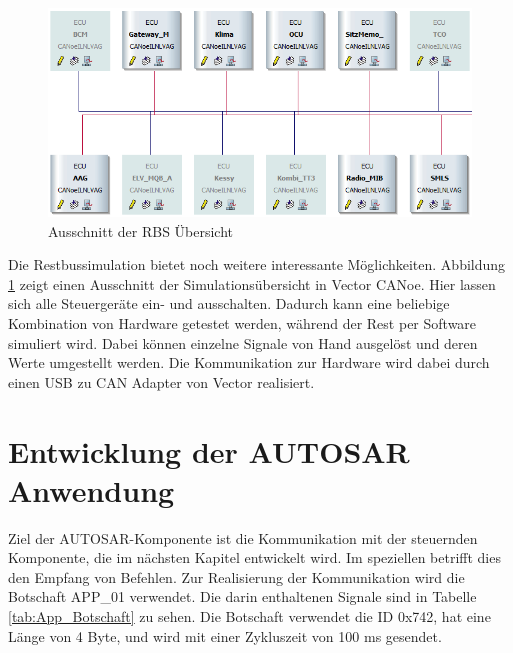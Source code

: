 \documentclass[
  a4paper,					    %
  twoside,
  DIV=calc,     				%
  bibliography=totoc,
  cleardoublepage=empty,
  ngerman,     					%
  final       					%
]{scrbook}
\begin{document}
\begin{figure}[tb]
    \centering
    \includegraphics[width=\textwidth]{rbs_ausschnitt}
    \caption{Ausschnitt der RBS Übersicht}
    \label{fig:rbs}
\end{figure}

Die Restbussimulation bietet noch weitere interessante Möglichkeiten. Abbildung \ref{fig:rbs} zeigt einen Ausschnitt der Simulationsübersicht in Vector CANoe. Hier lassen sich alle Steuergeräte ein- und ausschalten. Dadurch kann eine beliebige Kombination von Hardware getestet werden, während der Rest per Software simuliert wird. Dabei können einzelne Signale von Hand ausgelöst und deren Werte umgestellt werden. Die Kommunikation zur Hardware wird dabei durch einen USB zu CAN Adapter von Vector realisiert.










\section{Entwicklung der AUTOSAR Anwendung}
\label{sec:entwicklung_autosar}
Ziel der AUTOSAR-Komponente ist die Kommunikation mit der steuernden Komponente, die im nächsten Kapitel entwickelt wird. Im speziellen betrifft dies den Empfang von Befehlen. Zur Realisierung der Kommunikation wird die Botschaft APP\_01 verwendet. Die darin enthaltenen Signale sind in Tabelle \ref{tab:App_Botschaft} zu sehen. Die Botschaft verwendet die ID 0x742, hat eine Länge von 4 Byte, und wird mit einer Zykluszeit von 100 ms gesendet.
\end{document}
